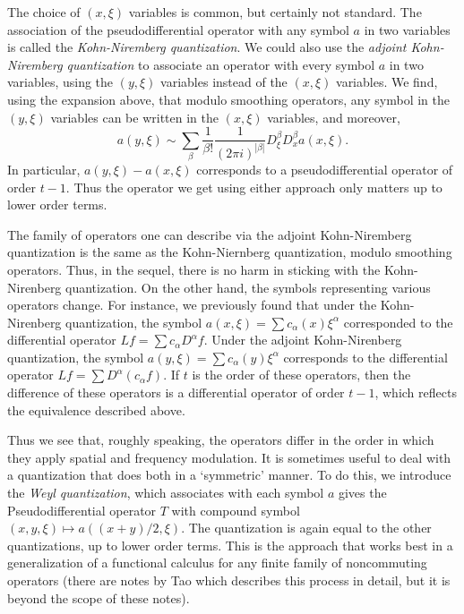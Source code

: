 The choice of $(x,\xi)$ variables is common, but certainly not standard. The association of the pseudodifferential operator with any symbol $a$ in two variables is called the \emph{Kohn-Niremberg quantization}. We could also use the \emph{adjoint Kohn-Niremberg quantization} to associate an operator with every symbol $a$ in two variables, using the $(y,\xi)$ variables instead of the $(x,\xi)$ variables. We find, using the expansion above, that modulo smoothing operators, any symbol in the $(y,\xi)$ variables can be written in the $(x,\xi)$ variables, and moreover,
%
\[ a(y,\xi) \sim \sum_\beta \frac{1}{\beta!} \frac{1}{(2 \pi i)^{|\beta|}} D^\beta_\xi D^\beta_x a(x,\xi). \]
%
In particular, $a(y,\xi) - a(x,\xi)$ corresponds to a pseudodifferential operator of order $t - 1$. Thus the operator we get using either approach only matters up to lower order terms.

The family of operators one can describe via the adjoint Kohn-Niremberg quantization is the same as the Kohn-Niernberg quantization, modulo smoothing operators. Thus, in the sequel, there is no harm in sticking with the Kohn-Nirenberg quantization. On the other hand, the symbols representing various operators change. For instance, we previously found that under the Kohn-Nirenberg quantization, the symbol $a(x,\xi) = \sum c_\alpha(x) \xi^\alpha$ corresponded to the differential operator $Lf = \sum c_\alpha D^\alpha f$. Under the adjoint Kohn-Nirenberg quantization, the symbol $a(y,\xi) = \sum c_\alpha(y) \xi^\alpha$ corresponds to the differential operator $Lf = \sum D^\alpha( c_\alpha f)$. If $t$ is the order of these operators, then the difference of these operators is a differential operator of order $t-1$, which reflects the equivalence described above.

Thus we see that, roughly speaking, the operators differ in the order in which they apply spatial and frequency modulation. It is sometimes useful to deal with a quantization that does both in a `symmetric' manner. To do this, we introduce the \emph{Weyl quantization}, which associates with each symbol $a$ gives the Pseudodifferential operator $T$ with compound symbol $(x,y,\xi) \mapsto a((x + y)/2, \xi)$. The quantization is again equal to the other quantizations, up to lower order terms. This is the approach that works best in a generalization of a functional calculus for any finite family of noncommuting operators (there are notes by Tao which describes this process in detail, but it is beyond the scope of these notes).

